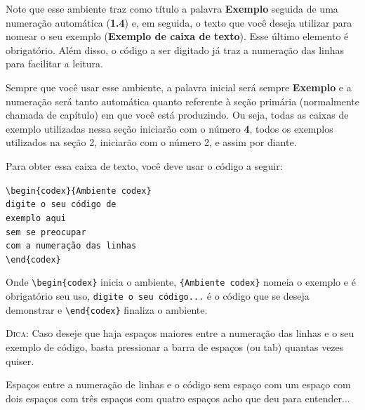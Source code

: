 \documentclass[a4paper,12pt,oneside]{memoir}
\begin{document}
Note que esse ambiente traz como título a palavra \textbf{Exemplo} seguida de uma numeração automática (\textbf{1.4}) e, em seguida, o texto que você deseja utilizar para nomear o seu exemplo (\textbf{Exemplo de caixa de texto}). Esse último elemento é obrigatório. Além disso, o código a ser digitado já traz a numeração das linhas para facilitar a leitura.

Sempre que você usar esse ambiente, a palavra inicial será sempre \textbf{Exemplo} e a numeração será tanto automática quanto referente à seção primária (normalmente chamada de capítulo) em que você está produzindo. Ou seja, todas as caixas de exemplo utilizadas nessa seção iniciarão com o número \textbf{4}, todos os exemplos utilizados na seção 2, iniciarão com o número 2, e assim por diante. 

Para obter essa caixa de texto, você deve usar o código a seguir: 

\indent\verb|\begin{codex}{Ambiente codex}|\\
\indent\verb|digite o seu código de|\\
\indent\verb|exemplo aqui|\\
\indent\verb|sem se preocupar|\\
\indent\verb|com a numeração das linhas|\\
\indent\verb|\end{codex}|

Onde \verb|\begin{codex}| inicia o ambiente, \verb|{Ambiente codex}| nomeia o exemplo e é obrigatório seu uso, \verb|digite o seu código...| é o código que se deseja demonstrar e \verb|\end{codex}| finaliza o ambiente.

\indent\textsc{Dica:} Caso deseje que haja espaços maiores entre a numeração das linhas e o seu exemplo de código, basta pressionar a barra de espaços (ou tab) quantas vezes quiser.

\begin{codex}{Espaços entre a numeração de linhas e o código}
sem espaço
 com um espaço
  com dois espaços
   com três espaços
    com quatro espaços
     acho que deu para entender...

\end{codex}
\backmatter{
\renewcommand{\bibname}{Referências}
\bibintoc



}

\end{document}
